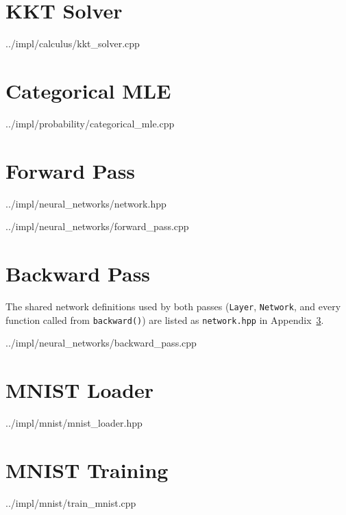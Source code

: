 \section{KKT Solver}\label{app:kkt-solver}

{../impl/calculus/kkt_solver.cpp}

\section{Categorical MLE}\label{app:categorical-mle}

{../impl/probability/categorical_mle.cpp}

\section{Forward Pass}\label{app:forward-pass}

{../impl/neural_networks/network.hpp}

{../impl/neural_networks/forward_pass.cpp}

\section{Backward Pass}\label{app:backward-pass}
The shared network definitions used by both passes (\texttt{Layer}, \texttt{Network}, and every function called from \texttt{backward()}) are listed as \texttt{network.hpp} in Appendix~\ref{app:forward-pass}.


{../impl/neural_networks/backward_pass.cpp}

\section{MNIST Loader}\label{app:load-mnist}

{../impl/mnist/mnist_loader.hpp}

\section{MNIST Training}\label{app:train-mnist}

{../impl/mnist/train_mnist.cpp}
